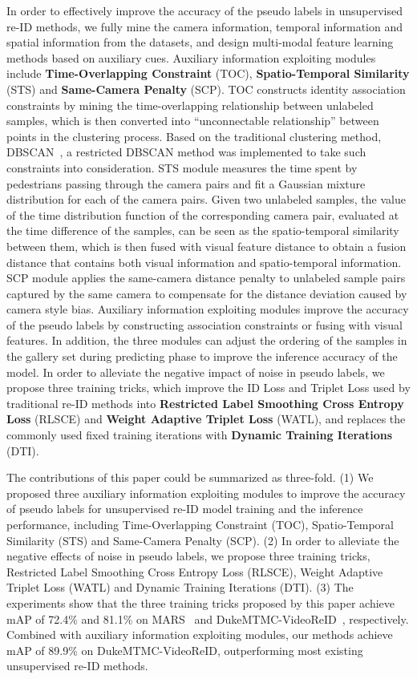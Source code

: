 \documentclass[10pt,twocolumn,letterpaper]{article}
\begin{document}
In order to effectively improve the accuracy of the pseudo labels in unsupervised re-ID methods, we fully mine the camera information, temporal information and spatial information from the datasets, and design multi-modal feature learning methods based on auxiliary cues. Auxiliary information exploiting modules include \textbf{Time-Overlapping Constraint} (TOC), \textbf{Spatio-Temporal Similarity} (STS) and \textbf{Same-Camera Penalty} (SCP). TOC constructs identity association constraints by mining the time-overlapping relationship between unlabeled samples, which is then converted into ``unconnectable relationship'' between points in the clustering process. Based on the traditional clustering method, DBSCAN~\cite{dbscan}, a restricted DBSCAN method was implemented to take such constraints into consideration. STS module measures the time spent by pedestrians passing through the camera pairs and fit a Gaussian mixture distribution for each of the camera pairs. Given two unlabeled samples, the value of the time distribution function of the corresponding camera pair, evaluated at the time difference of the samples, can be seen as the spatio-temporal similarity between them, which is then fused with visual feature distance to obtain a fusion distance that contains both visual information and spatio-temporal information. SCP module applies the same-camera distance penalty to unlabeled sample pairs captured by the same camera to compensate for the distance deviation caused by camera style bias. Auxiliary information exploiting modules improve the accuracy of the pseudo labels by constructing association constraints or fusing with visual features. In addition, the three modules can adjust the ordering of the samples in the gallery set during predicting phase to improve the inference accuracy of the model. In order to alleviate the negative impact of noise in pseudo labels, we propose three training tricks, which improve the ID Loss and Triplet Loss used by traditional re-ID methods into \textbf{Restricted Label Smoothing Cross Entropy Loss} (RLSCE) and \textbf{Weight Adaptive Triplet Loss} (WATL), and replaces the commonly used fixed training iterations with \textbf{Dynamic Training Iterations} (DTI).

The contributions of this paper could be summarized as three-fold. (1) We proposed three auxiliary information exploiting modules to improve the accuracy of pseudo labels for unsupervised re-ID model training and the inference performance, including Time-Overlapping Constraint (TOC), Spatio-Temporal Similarity (STS) and Same-Camera Penalty (SCP). (2) In order to alleviate the negative effects of noise in pseudo labels, we propose three training tricks, Restricted Label Smoothing Cross Entropy Loss (RLSCE), Weight Adaptive Triplet Loss (WATL) and Dynamic Training Iterations (DTI). (3) The experiments show that the three training tricks proposed by this paper achieve mAP of 72.4\% and 81.1\% on MARS~\cite{mars} and DukeMTMC-VideoReID~\cite{dukemtmc}, respectively. Combined with auxiliary information exploiting modules, our methods achieve mAP of 89.9\% on DukeMTMC-VideoReID, outperforming most existing unsupervised re-ID methods.
\end{document}
